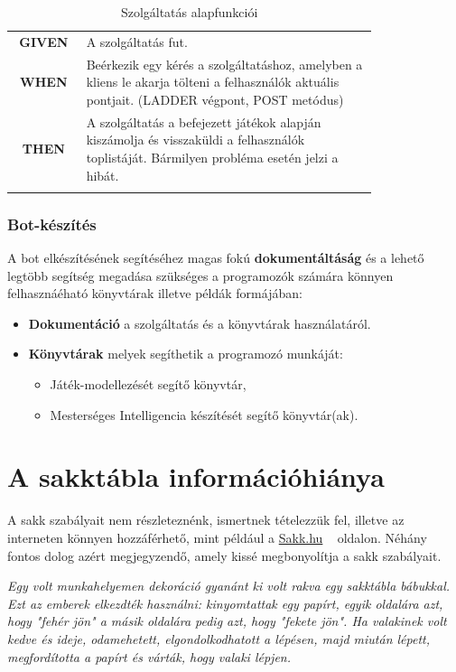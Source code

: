 \documentclass[twoside, a4paper, 12pt]{book}
\begin{document}
\begin{longtable}[c]{|c|p{0.8\linewidth}|}
	\textbf{GIVEN} &
	A szolgáltatás fut.
	\\ \nobreakhline
	
	\textbf{WHEN} &
	Beérkezik egy kérés a szolgáltatáshoz, amelyben a kliens le akarja tölteni a felhasználók aktuális pontjait. (LADDER végpont, POST metódus)
	\\
	\nobreakhline
	
	\textbf{THEN} &
	A szolgáltatás a befejezett játékok alapján kiszámolja és visszaküldi a felhasználók toplistáját.
	Bármilyen probléma esetén jelzi a hibát.
	\\
	\hline
	
	\caption{Szolgáltatás alapfunkciói}
	\label{userStories:server:api}\\
\end{longtable} 

\subsubsection{Bot-készítés}
A bot elkészítésének segítéséhez magas fokú \textbf{dokumentáltáság} és a lehető legtöbb segítség megadása szükséges a programozók számára könnyen felhasznáéható könyvtárak illetve példák formájában:
\begin{itemize}
	\item \textbf{Dokumentáció} a szolgáltatás és a könyvtárak használatáról.
	\item \textbf{Könyvtárak} melyek segíthetik a programozó munkáját:
	\begin{itemize}
		\item Játék-modellezését segítő könyvtár,
		\item Mesterséges Intelligencia készítését segítő könyvtár(ak).
	\end{itemize}
\end{itemize}

\section{A sakktábla információhiánya}\label{A Sakktábla információhiánya}
A sakk szabályait nem részleteznénk, ismertnek tételezzük fel, illetve az interneten könnyen hozzáférhető, mint például a \href{http://www.sakk.hu/help/sakk_szabalyok.html}{Sakk.hu} ~\cite{chessrulessakkhu} oldalon. Néhány fontos dolog azért megjegyzendő, amely kissé megbonyolítja a sakk szabályait.

\textit{Egy volt munkahelyemen dekoráció gyanánt ki volt rakva egy sakktábla bábukkal. Ezt az emberek elkezdték használni: kinyomtattak egy papírt, egyik oldalára azt, hogy "fehér jön" a másik oldalára pedig azt, hogy "fekete jön". Ha valakinek volt kedve és ideje, odamehetett, elgondolkodhatott a lépésen, majd miután lépett, megfordította a papírt és várták, hogy valaki lépjen.}
\end{document}
